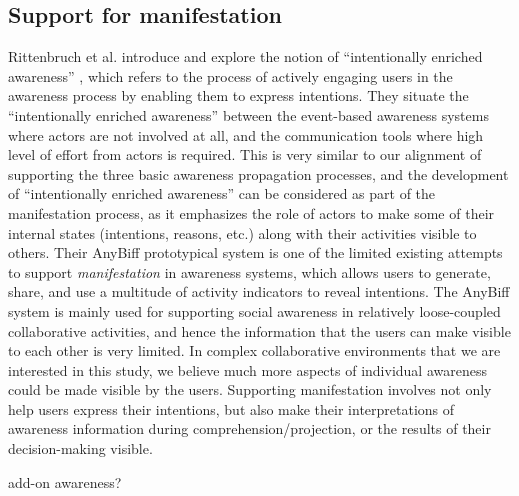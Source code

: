 \subsection{Support for manifestation} %
\label{sub:support_for_manifestation}
Rittenbruch et al. introduce and explore the notion of ``intentionally enriched awareness'' \cite{Rittenbruch2007}, which refers to the process of actively engaging users in the awareness process by enabling them to express intentions. They situate the ``intentionally enriched awareness'' between the event-based awareness systems where actors are not involved at all, and the communication tools where high level of effort from actors is required. This is very similar to our alignment of supporting the three basic awareness propagation processes, and the development of ``intentionally enriched awareness'' can be considered as part of the manifestation process, as it emphasizes the role of actors to make some of their internal states (intentions, reasons, etc.) along with their activities visible to others. Their AnyBiff prototypical system is one of the limited existing attempts to support \emph{manifestation} in awareness systems, which allows users to generate, share, and use a multitude of activity indicators to reveal intentions. The AnyBiff system is mainly used for supporting social awareness in relatively loose-coupled collaborative activities, and hence the information that the users can make visible to each other is very limited. In complex collaborative environments that we are interested in this study, we believe much more aspects of individual awareness could be made visible by the users. Supporting manifestation involves not only help users express their intentions, but also make their interpretations of awareness information during comprehension/projection, or the results of their decision-making visible.


add-on awareness?



